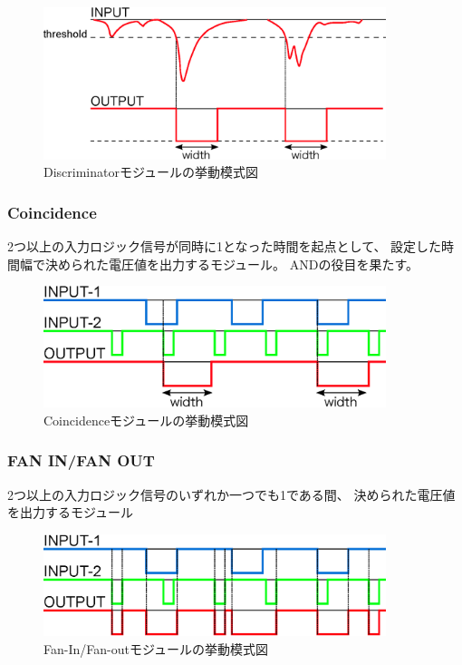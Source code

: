 \documentclass{jarticle}
\begin{document}
	  \begin{figure}[htbp]
	   \begin{center}
	    \includegraphics[width = 100mm]{./picture/Discriminator.eps}
	   \end{center}
	   \caption{Discriminatorモジュールの挙動模式図}
	   \label{Fig:Discri}
	  \end{figure}
	  
    	  \subsubsection*{Coincidence}
	  
	  2つ以上の入力ロジック信号が同時に1となった時間を起点として、
	  設定した時間幅で決められた電圧値を出力するモジュール。
	  ANDの役目を果たす。
	  
	  \begin{figure}[htbp]
	   \begin{center}
	    \includegraphics[width = 100mm]{./picture/Coincidence.eps}
	   \end{center}
	   \caption{Coincidenceモジュールの挙動模式図}
	   \label{Fig:Coincidence}
	  \end{figure}
	  
   \subsubsection*{FAN IN/FAN OUT}
	  
	  2つ以上の入力ロジック信号のいずれか一つでも1である間、
	  決められた電圧値を出力するモジュール
	  
	  \begin{figure}[H]
	   \begin{center}
	    \includegraphics[width = 100mm]{./picture/FaninFanout.eps}
	   \end{center}
	   \caption{Fan-In/Fan-outモジュールの挙動模式図}
	   \label{Fig:FaninFanout}
	  \end{figure}
	  
\end{document}
